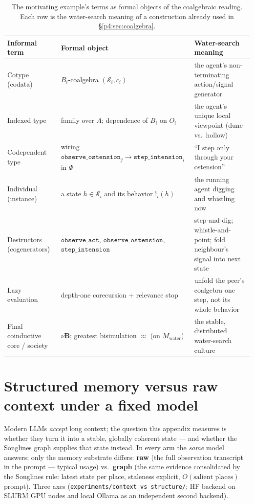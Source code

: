 \documentclass{article}
\newcommand{\method}[1]{\texttt{#1}}
\begin{document}
\begin{table}[t]
\caption{The motivating example's terms as formal objects of the coalgebraic
reading. Each row is the water-search meaning of a construction already used
in \S\ref{p4:sec:coalgebra}.}
\label{p4:tab:coalg-dictionary}
\centering
\small
\begin{tabular}{p{2.9cm} p{4.3cm} p{4.4cm}}
\toprule
Informal term & Formal object & Water-search meaning \\
\midrule
Cotype (codata) & $B_i$-coalgebra $(\mathcal{S}_i,c_i)$ & the agent's non-terminating action/signal generator \\
Indexed type & family over $A$; dependence of $B_i$ on $O_i$ & the agent's unique local viewpoint (dune vs.\ hollow) \\
Codependent type & wiring $\method{observe\_ostension}_j\!\to\!\method{step\_intension}_i$ in $\Phi$ & ``I step only through your ostension'' \\
Individual (instance) & a state $h\in\mathcal{S}_i$ and its behavior $!_i(h)$ & the running agent digging and whistling now \\
Destructors (cogenerators) & $\method{observe\_act}$, $\method{observe\_ostension}$, $\method{step\_intension}$ & step-and-dig; whistle-and-point; fold neighbour's signal into next state \\
Lazy evaluation & depth-one corecursion + relevance stop & unfold the peer's coalgebra one step, not its whole behavior \\
Final coinductive core / society & $\nu\mathbf{B}$; greatest bisimulation $\approx$ (on $M_{\mathrm{water}}$) & the stable, distributed water-search culture \\
\bottomrule
\end{tabular}
\end{table}


\section{Structured memory versus raw context under a fixed model}
\label{p4:app:ctx-vs-structure}

Modern LLMs \emph{accept} long context; the question this appendix measures is
whether they turn it into a stable, globally coherent state --- and whether the
Songlines graph supplies that state instead. In every arm the \emph{same} model
answers; only the memory substrate differs: \textbf{raw} (the full observation
transcript in the prompt --- typical usage) vs.\ \textbf{graph} (the same
evidence consolidated by the Songlines rule: latest state per place, staleness
explicit, $O(\text{salient places})$ prompt). Three axes
(\method{experiments/context\_vs\_structure/}; HF backend on SLURM GPU nodes
and local Ollama as an independent second backend).
\end{document}
